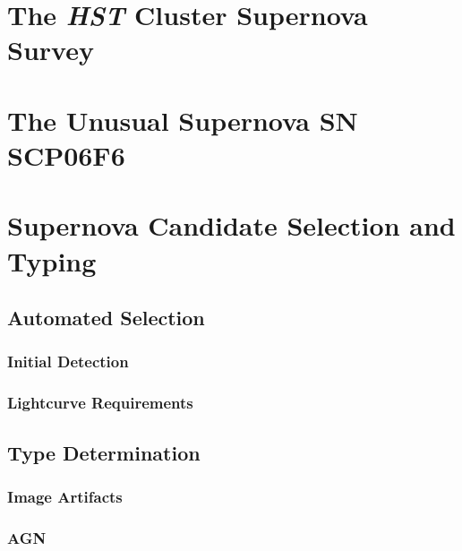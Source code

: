 \documentclass[12pt]{ucthesis}
\begin{document}
\chapter{The \emph{HST} Cluster Supernova Survey} \label{sec:survey}


\chapter{The Unusual Supernova SN SCP06F6} \label{sec:scp06f6}


\chapter{Supernova Candidate Selection and Typing} \label{sec:cands}


\section{Automated Selection}

\subsection{Initial Detection} \label{sec:cands_search}


\subsection{Lightcurve Requirements} \label{sec:cands_lccuts}


\section{Type Determination} \label{sec:cands_typing}


\subsection{Image Artifacts} \label{sec:cands_artifacts}


\subsection{AGN} \label{sec:cands_agn}

\end{document}
